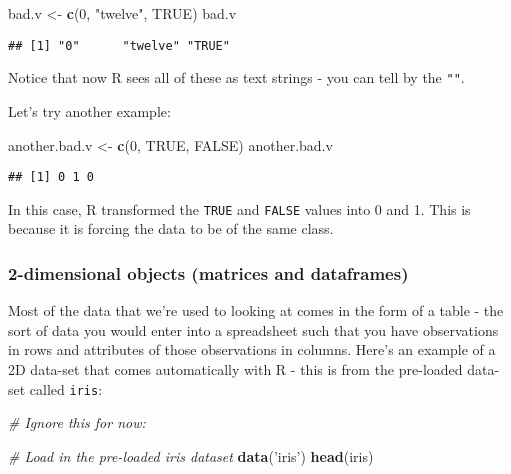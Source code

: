 \documentclass[]{article}
\newenvironment{Shaded}{\begin{snugshade}}{\end{snugshade}}
\newcommand{\KeywordTok}[1]{\textcolor[rgb]{0.13,0.29,0.53}{\textbf{#1}}}
\newcommand{\DecValTok}[1]{\textcolor[rgb]{0.00,0.00,0.81}{#1}}
\newcommand{\StringTok}[1]{\textcolor[rgb]{0.31,0.60,0.02}{#1}}
\newcommand{\CommentTok}[1]{\textcolor[rgb]{0.56,0.35,0.01}{\textit{#1}}}
\newcommand{\OtherTok}[1]{\textcolor[rgb]{0.56,0.35,0.01}{#1}}
\newcommand{\NormalTok}[1]{#1}
\begin{document}
\begin{Shaded}
\begin{Highlighting}[]
\NormalTok{bad.v <-}\StringTok{ }\KeywordTok{c}\NormalTok{(}\DecValTok{0}\NormalTok{, }\StringTok{"twelve"}\NormalTok{, }\OtherTok{TRUE}\NormalTok{)}
\NormalTok{bad.v}
\end{Highlighting}
\end{Shaded}

\begin{verbatim}
## [1] "0"      "twelve" "TRUE"
\end{verbatim}

Notice that now R sees all of these as text strings - you can tell by
the \texttt{""}.

Let's try another example:

\begin{Shaded}
\begin{Highlighting}[]
\NormalTok{another.bad.v <-}\StringTok{ }\KeywordTok{c}\NormalTok{(}\DecValTok{0}\NormalTok{, }\OtherTok{TRUE}\NormalTok{, }\OtherTok{FALSE}\NormalTok{)}
\NormalTok{another.bad.v}
\end{Highlighting}
\end{Shaded}

\begin{verbatim}
## [1] 0 1 0
\end{verbatim}

In this case, R transformed the \texttt{TRUE} and \texttt{FALSE} values
into 0 and 1. This is because it is forcing the data to be of the same
class.

\subsubsection{2-dimensional objects (matrices and
dataframes)}\label{dimensional-objects-matrices-and-dataframes}

Most of the data that we're used to looking at comes in the form of a
table - the sort of data you would enter into a spreadsheet such that
you have observations in rows and attributes of those observations in
columns. Here's an example of a 2D data-set that comes automatically
with R - this is from the pre-loaded data-set called \texttt{iris}:

\begin{Shaded}
\begin{Highlighting}[]
\CommentTok{# Ignore this for now:}

\CommentTok{# Load in the pre-loaded iris dataset}
\KeywordTok{data}\NormalTok{(}\StringTok{'iris'}\NormalTok{)}
\KeywordTok{head}\NormalTok{(iris)}
\end{Highlighting}
\end{Shaded}
\end{document}
